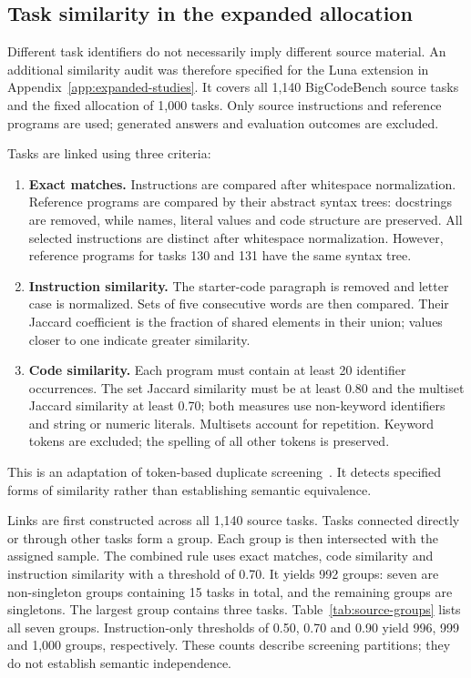 \subsection{Task similarity in the expanded allocation}
Different task identifiers do not necessarily imply different source material. An additional similarity audit was therefore specified for the Luna extension in Appendix~\ref{app:expanded-studies}. It covers all 1,140 BigCodeBench source tasks and the fixed allocation of 1,000 tasks. Only source instructions and reference programs are used; generated answers and evaluation outcomes are excluded.

Tasks are linked using three criteria:
\begin{enumerate}
\item \textbf{Exact matches.} Instructions are compared after whitespace normalization. Reference programs are compared by their abstract syntax trees: docstrings are removed, while names, literal values and code structure are preserved. All selected instructions are distinct after whitespace normalization. However, reference programs for tasks 130 and 131 have the same syntax tree.
\item \textbf{Instruction similarity.} The starter-code paragraph is removed and letter case is normalized. Sets of five consecutive words are then compared. Their Jaccard coefficient is the fraction of shared elements in their union; values closer to one indicate greater similarity.
\item \textbf{Code similarity.} Each program must contain at least 20 identifier occurrences. The set Jaccard similarity must be at least 0.80 and the multiset Jaccard similarity at least 0.70; both measures use non-keyword identifiers and string or numeric literals. Multisets account for repetition. Keyword tokens are excluded; the spelling of all other tokens is preserved.
\end{enumerate}
This is an adaptation of token-based duplicate screening~\cite{allamanis2019duplication}. It detects specified forms of similarity rather than establishing semantic equivalence.

Links are first constructed across all 1,140 source tasks. Tasks connected directly or through other tasks form a group. Each group is then intersected with the assigned sample. The combined rule uses exact matches, code similarity and instruction similarity with a threshold of 0.70. It yields 992 groups: seven are non-singleton groups containing 15 tasks in total, and the remaining groups are singletons. The largest group contains three tasks. Table~\ref{tab:source-groups} lists all seven groups. Instruction-only thresholds of 0.50, 0.70 and 0.90 yield 996, 999 and 1,000 groups, respectively. These counts describe screening partitions; they do not establish semantic independence.

